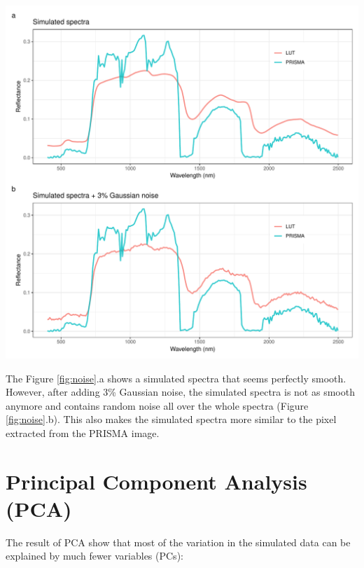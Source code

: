 \documentclass[a4paper, twoside]{templates/ociamthesis}
\let\origfigure\figure
\let\endorigfigure\endfigure
\renewenvironment{figure}[1][2] {
    \expandafter\origfigure\expandafter[H]
} {
    \endorigfigure
}
\begin{document}
\begin{figure}
\includegraphics[width=0.9\linewidth]{./figures/noise} \caption{Effect of adding $3\%$ Gaussian noise to the simulated spectra. The randomly chosen pixel from the PRISMA data was plotted to illustrate the noise found typically in the image}\label{fig:noise}
\end{figure}

The Figure \ref{fig:noise}.a shows a simulated spectra that seems perfectly smooth. However, after adding 3\% Gaussian noise, the simulated spectra is not as smooth anymore and contains random noise all over the whole spectra (Figure \ref{fig:noise}.b). This also makes the simulated spectra more similar to the pixel extracted from the PRISMA image.

\hypertarget{principal-component-analysis-pca-1}{%
\section{Principal Component Analysis (PCA)}\label{principal-component-analysis-pca-1}}

The result of PCA show that most of the variation in the simulated data can be explained by much fewer variables (PCs):
\end{document}
